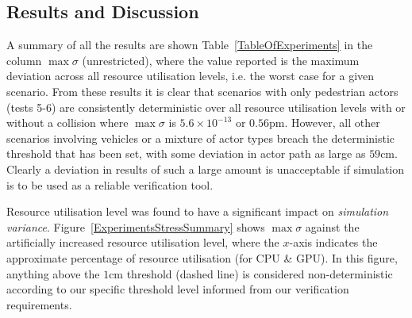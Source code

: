 \documentclass[letterpaper, 10 pt, journal, twoside]{IEEEtran}
\begin{document}





\subsection{Results and Discussion}\label{ResultsSection}
A summary of all the results are shown Table~\ref{TableOfExperiments} in the column $\max\sigma$ (unrestricted), where the value reported is the maximum deviation across all resource utilisation levels, i.e. the worst case for a given scenario.  
%
From these  results it is clear that scenarios with only pedestrian actors (tests 5-6) are consistently deterministic over all resource utilisation levels with or without a collision where $\max\sigma$ is $5.6\times10^{-13}$ or $0.56\si{\pico\metre}$. However, all other scenarios involving vehicles or a mixture of actor types breach the deterministic threshold that has been set, with some deviation in actor path as large as $59$cm. 
%
Clearly a deviation in results of such a large amount is unacceptable if simulation is to be used as a reliable verification tool.

Resource utilisation level was found to have a significant impact on \textit{simulation variance}.
%
Figure~\ref{ExperimentsStressSummary} shows $\max\sigma$ against the artificially increased resource utilisation level, where the $x$-axis indicates the approximate percentage of resource utilisation (for CPU \& GPU). In this figure, anything above the $1$cm threshold (dashed line) is considered non-deterministic according to our specific threshold level informed from our verification requirements.
%
%
\end{document}
